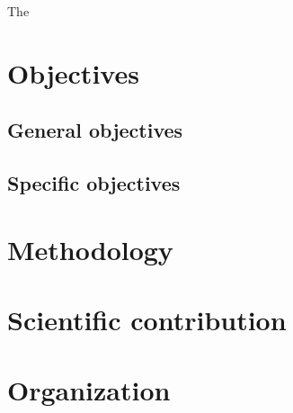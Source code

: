 The \cite{mceliece1978public}
\section{Objectives}
\subsection{General objectives}
\subsection{Specific objectives}
\section{Methodology}
\section{Scientific contribution}
\section{Organization}
